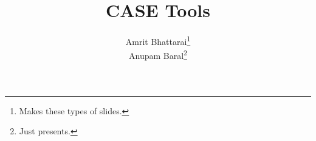 %
%
%
% 
%
%
%
% 
\documentclass[14pt, aspectratio=1610]{beamer}
\usepackage[utf8]{inputenc}
\usepackage{xcolor}



\title{CASE Tools}
\author{Amrit Bhattarai\thanks{Makes these types of slides.}\\Anupam Baral\thanks{Just presents.}}



\maketitle

\begin{frame}{What are \textbf{CASE Tools}?}
	\begin{itemize}
		\item<1-> \textbf{CASE} stands for \textcolor{emphasis}{Computer-Aided Software Engineering}.
		\item<1-> \textbf{CASE Tools} help system analysts to:
			\begin{enumerate}
				\item<2-> Develop information systems.
				\item<2-> Maintain information systems.
			\end{enumerate}
		\item<3-> These tools aim to \textcolor{emphasis}{automate} the software development lifecycle.
	\end{itemize}
\end{frame}

